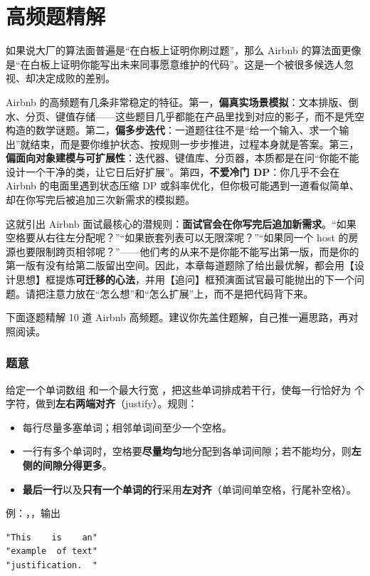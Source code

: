 \chapter{高频题精解}

如果说大厂的算法面普遍是“在白板上证明你刷过题”，那么 Airbnb 的算法面更像是“在白板上证明你能写出未来同事愿意维护的代码”。这是一个被很多候选人忽视、却决定成败的差别。

Airbnb 的高频题有几条非常稳定的特征。第一，\textbf{偏真实场景模拟}：文本排版、倒水、分页、键值存储——这些题目几乎都能在产品里找到对应的影子，而不是凭空构造的数学谜题。第二，\textbf{偏多步迭代}：一道题往往不是“给一个输入、求一个输出”就结束，而是要你维护状态、按规则一步步推进，过程本身就是答案。第三，\textbf{偏面向对象建模与可扩展性}：迭代器、键值库、分页器，本质都是在问“你能不能设计一个干净的类，让它日后好扩展”。第四，\textbf{不爱冷门 DP}：你几乎不会在 Airbnb 的电面里遇到状态压缩 DP 或斜率优化，但你极可能遇到一道看似简单、却在你写完后被追加三次新需求的模拟题。

这就引出 Airbnb 面试最核心的潜规则：\textbf{面试官会在你写完后追加新需求}。“如果空格要从右往左分配呢？”“如果嵌套列表可以无限深呢？”“如果同一个 host 的房源也要限制跨页相邻呢？”——他们考的从来不是你能不能写出第一版，而是你的第一版有没有给第二版留出空间。因此，本章每道题除了给出最优解，都会用【设计思想】框提炼\textbf{可迁移的心法}，并用【追问】框预演面试官最可能抛出的下一个问题。请把注意力放在“怎么想”和“怎么扩展”上，而不是把代码背下来。

下面逐题精解 10 道 Airbnb 高频题。建议你先盖住题解，自己推一遍思路，再对照阅读。


\subsection*{题意}
给定一个单词数组  和一个最大行宽 ，把这些单词排成若干行，使每一行恰好为  个字符，做到\textbf{左右两端对齐}（justify）。规则：
\begin{itemize}
  \item 每行尽量多塞单词；相邻单词间至少一个空格。
  \item 一行有多个单词时，空格要\textbf{尽量均匀}地分配到各单词间隙；若不能均分，则\textbf{左侧的间隙分得更多}。
  \item \textbf{最后一行}以及\textbf{只有一个单词的行}采用\textbf{左对齐}（单词间单空格，行尾补空格）。
\end{itemize}
例：，，输出
\begin{lstlisting}
"This    is    an"
"example  of text"
"justification.  "
\end{lstlisting}

